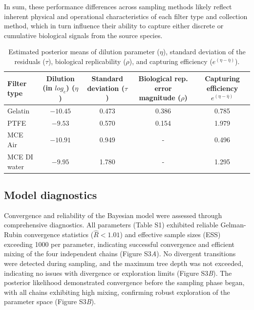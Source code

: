 \documentclass{article}
\begin{document}
In sum, these performance differences across sampling methods likely reflect inherent physical and operational characteristics of each filter type and collection method, which in turn influence their ability to capture either discrete or cumulative biological signals from the source species.

\begin{table}[h!]
\centering
\caption{Estimated posterior means of dilution parameter ($\eta$), standard deviation of the residuals ($\tau$), biological replicability ($\rho$), and capturing efficiency ($e^{(\eta-\overline{\eta})}$).}
\label{tab:filter_error}
\begin{tabular}{lcccc}
\textbf{Filter type} & \makecell{\textbf{Dilution}\\ {(in $log_e$)}\\($\eta$)} & \makecell{\textbf{Standard}\\\textbf{deviation}\\($\tau$)} & \makecell{\textbf{Biological rep.}\\\textbf{error magnitude}\\($\rho$)} & \makecell{\textbf{Capturing}\\\textbf{efficiency}\\$e^{(\eta - \overline{\eta})}$} \\
\hline
Gelatin & $-10.45$ & 0.473 & 0.386 & 0.785\\ 
PTFE & $-9.53$ & 0.570 & 0.154 & 1.979\\
MCE Air & $-10.91$ & 0.949 & - & 0.496\\
MCE DI water & $-9.95$ & 1.780  & - & 1.295\\
\end{tabular}
\end{table}

\subsection{Model diagnostics}

Convergence and reliability of the Bayesian model were assessed through comprehensive diagnostics. All parameters (Table S1) exhibited reliable Gelman-Rubin convergence statistics ($\hat{R} < 1.01$) and effective sample sizes (ESS) exceeding 1000 per parameter, indicating successful convergence and efficient mixing of the four independent chains (Figure S3\textit{A}). No divergent transitions were detected during sampling, and the maximum tree depth was not exceeded, indicating no issues with divergence or exploration limits (Figure S3\textit{B}). The posterior likelihood demonstrated convergence before the sampling phase began, with all chains exhibiting high mixing, confirming robust exploration of the parameter space (Figure S3\textit{B}).
\end{document}
